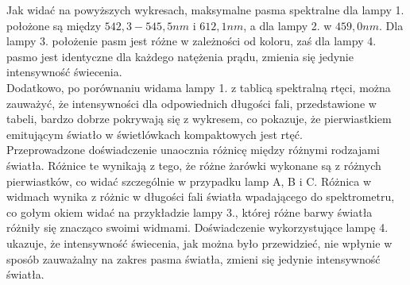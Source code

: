\documentclass[10pt,a4paper]{article}
\newcommand{\forceindent}{\leavevmode{\parindent=3em\indent}}
\begin{document}
\forceindent Jak widać na powyższych wykresach, maksymalne pasma spektralne dla lampy 1. położone są między $ 542,3 - 545,5 nm$ i $612,1 nm$, a dla lampy 2. w $459,0 nm$. Dla lampy 3. położenie pasm jest różne w zależności od koloru, zaś dla lampy 4. pasmo jest identyczne dla każdego natężenia prądu, zmienia się jedynie intensywność świecenia.\\

\forceindent Dodatkowo, po porównaniu widama lampy 1. z tablicą spektralną rtęci, można zauważyć, że intensywności dla odpowiednich długości fali, przedstawione w tabeli, bardzo dobrze pokrywają się z wykresem, co pokazuje, że pierwiastkiem emitującym światło w świetlówkach kompaktowych jest rtęć. \\

\forceindent Przeprowadzone doświadczenie unaocznia różnicę między różnymi rodzajami światła. Różnice te wynikają z tego, że różne żarówki wykonane są z różnych pierwiastków, co widać szczególnie w przypadku lamp A, B i C. Różnica w widmach wynika z różnic w długości fali światła wpadającego do spektrometru, co gołym okiem widać na przykładzie lampy 3., której różne barwy światła różniły się znacząco swoimi widmami. Doświadczenie wykorzystujące lampę 4. ukazuje, że intensywność świecenia, jak można było przewidzieć, nie wpłynie w sposób zauważalny na zakres pasma światła, zmieni się jedynie intensywność światła.
\end{document}

